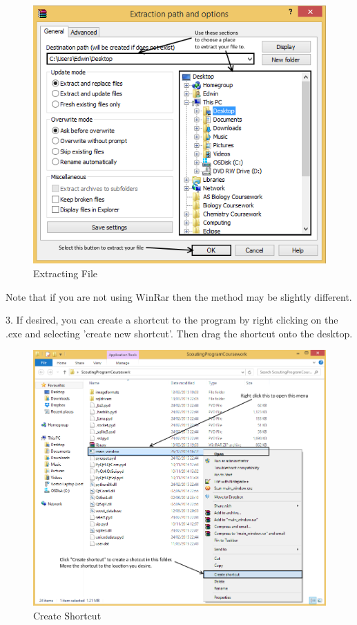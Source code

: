 \begin{figure}[H]
	\includegraphics[width=\textwidth]{./Manual/Images/Extracting2.png}
	\caption{Extracting File} \label{fig:extracting_file_2}
\end{figure}

Note that if you are not using WinRar then the method may be slightly different.

3. If desired, you can create a shortcut to the program by right clicking on the .exe and selecting 'create new shortcut'. Then drag the shortcut onto the desktop.

\begin{figure}[H]
	\includegraphics[width=\textwidth]{./Manual/Images/CreateShortcut.png}
	\caption{Create Shortcut} \label{fig:create_shortcut}
\end{figure}

